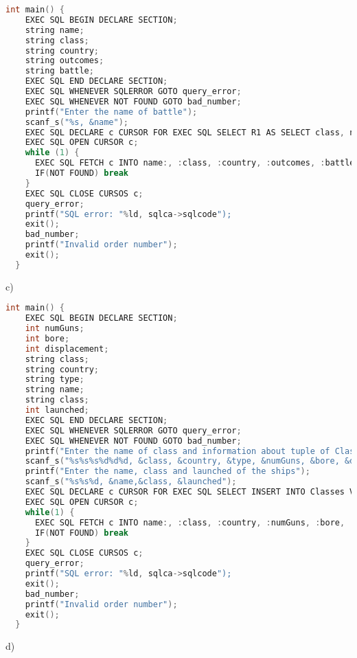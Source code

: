\documentclass[../../main.tex]{subfiles}
\begin{document}
\begin{lstlisting}[language=c]
  int main() {
    EXEC SQL BEGIN DECLARE SECTION;
    string name;
    string class;
    string country;
    string outcomes;
    string battle;
    EXEC SQL END DECLARE SECTION;
    EXEC SQL WHENEVER SQLERROR GOTO query_error;
    EXEC SQL WHENEVER NOT FOUND GOTO bad_number;
    printf("Enter the name of battle");
    scanf_s("%s, &name");
    EXEC SQL DECLARE c CURSOR FOR EXEC SQL SELECT R1 AS SELECT class, name AS ship, country FROM Classes NATURAL JOIN Ships, R2 AS SELECT battle, result, country FROM Outcomes NATURAL JOIN R1, R3 AS (SELECT count(*) AS COUNT, country FROM R2 WHERE result=? AND battle=? GROUP BY country) SELECT country FROM R3 WHERE COUNT="", SELECT(max(COUNT) FROM R3);
    EXEC SQL OPEN CURSOR c;
    while (1) {
      EXEC SQL FETCH c INTO name:, :class, :country, :outcomes, :battle;
      IF(NOT FOUND) break
    }
    EXEC SQL CLOSE CURSOS c;
    query_error;
    printf("SQL error: "%ld, sqlca->sqlcode");
    exit();
    bad_number;
    printf("Invalid order number");
    exit();
  }
\end{lstlisting}

c)

\begin{lstlisting}[language=c]
  int main() {
    EXEC SQL BEGIN DECLARE SECTION;
    int numGuns;
    int bore;
    int displacement;
    string class;
    string country;
    string type;
    string name;
    string class;
    int launched;
    EXEC SQL END DECLARE SECTION;
    EXEC SQL WHENEVER SQLERROR GOTO query_error;
    EXEC SQL WHENEVER NOT FOUND GOTO bad_number;
    printf("Enter the name of class and information about tuple of Classes");
    scanf_s("%s%s%s%d%d%d, &class, &country, &type, &numGuns, &bore, &displacement");
    printf("Enter the name, class and launched of the ships");
    scanf_s("%s%s%d, &name,&class, &launched");
    EXEC SQL DECLARE c CURSOR FOR EXEC SQL SELECT INSERT INTO Classes VALUES(?,?,?,?,?,?), INSERT INTO Ships VALUES(?,?,?);
    EXEC SQL OPEN CURSOR c;
    while(1) {
      EXEC SQL FETCH c INTO name:, :class, :country, :numGuns, :bore, :displacement, :type, :name, :class, :launched;
      IF(NOT FOUND) break
    }
    EXEC SQL CLOSE CURSOS c;
    query_error;
    printf("SQL error: "%ld, sqlca->sqlcode");
    exit();
    bad_number;
    printf("Invalid order number");
    exit();
  }
\end{lstlisting}

d)
\end{document}
